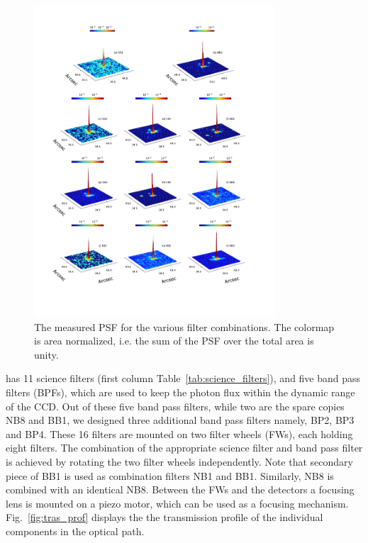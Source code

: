 \begin{figure}
    \centering
    \includegraphics[trim={1.7cm 3cm 2cm 1.5cm},clip,width=0.8\textwidth]{Figures/suit_psf_3d.pdf}
    \caption{The measured PSF for the various filter combinations. The colormap is area normalized, i.e. the sum of the PSF over the total area is unity.}
    \label{fig:psf_3d}
\end{figure}

{\suit} has 11 science filters (first column Table~\ref{tab:science_filters}), and five band pass filters (BPFs), which are used to keep the photon flux within the dynamic range of the CCD. Out of these five band pass filters, while two are the spare copies NB8 and BB1, we designed three additional band pass filters namely, BP2, BP3 and BP4. These 16 filters are mounted on two filter wheels (FWs), each holding eight filters. The combination of the appropriate science filter and band pass filter is achieved by rotating the two filter wheels independently. Note that secondary piece of BB1 is used as combination filters NB1 and BB1. Similarly, NB8 is combined with an identical NB8. Between the FWs and the detectors a focusing lens is mounted on a piezo motor, which can be used as a focusing mechanism.  Fig.~\ref{fig:tras_prof} displays the the transmission profile of the individual components in the optical path.

